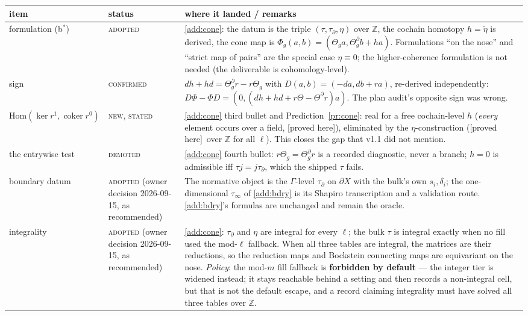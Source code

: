 \documentclass[11pt]{article}
\theoremstyle{remark}
\newcommand{\Z}{\mathbb{Z}}
\newcommand{\Hom}{\mathrm{Hom}}
\newcommand{\Ga}{\Gamma}
\DeclareMathOperator{\coker}{coker}
\newcommand{\PROVED}{\textsf{[proved here]}}
\begin{document}
\begin{center}\footnotesize
\begin{longtable}{@{}>{\raggedright\arraybackslash}p{2.4cm}>{\raggedright\arraybackslash}p{2.3cm}>{\raggedright\arraybackslash}p{10.8cm}@{}}
\toprule
item & status & where it landed / remarks \\
\midrule
\endhead
formulation (b$^\ast$) & \textsc{adopted} & \ref{add:cone}: the datum is the triple $(\tau,\tau_\partial,\eta)$ over $\Z$, the cochain homotopy $h=\tilde\eta$ is derived, the cone map is $\Phi_g(a,b)=(\Theta_ga,\Theta^\partial_gb+ha)$. Formulations ``on the nose'' and ``strict map of pairs'' are the special case $\eta\equiv0$; the higher-coherence formulation is not needed (the deliverable is cohomology-level). \\
sign & \textsc{confirmed} & $dh+hd=\Theta^\partial_gr-r\Theta_g$ with $D(a,b)=(-da,db+ra)$, re-derived independently: $D\Phi-\Phi D=(0,(dh+hd+r\Theta-\Theta^\partial r)a)$. The plan audit's opposite sign was wrong. \\
$\Hom(\ker r^1,\coker r^0)$ & \textsc{new, stated} & \ref{add:cone} third bullet and Prediction~\ref{pr:cone}: real for a free cochain-level $h$ (\emph{every} element occurs over a field, \PROVED), eliminated by the $\eta$-construction (\PROVED\ over $\Z$ for all $\ell$). This closes the gap that v1.1 did not mention. \\
the entrywise test & \textsc{demoted} & \ref{add:cone} fourth bullet: $r\Theta_g=\Theta^\partial_gr$ is a recorded diagnostic, never a branch; $h=0$ is admissible iff $\tau j=j\tau_\partial$, which the shipped $\tau$ fails. \\
boundary datum & \textsc{adopted} (owner decision 2026-09-15, as recommended) & The normative object is the $\Ga$-level $\tau_\partial$ on $\partial X$ with the bulk's own $s_i,\delta_i$; the one-dimensional $\tau_\infty$ of \ref{add:bdry} is its Shapiro transcription and a validation route. \ref{add:bdry}'s formulas are unchanged and remain the oracle. \\
integrality & \textsc{adopted} (owner decision 2026-09-15, as recommended) & \ref{add:cone}: $\tau_\partial$ and $\eta$ are integral for every $\ell$; the bulk $\tau$ is integral exactly when no fill used the mod-$\ell$ fallback. When all three tables are integral, the matrices are their reductions, so the reduction maps and Bockstein connecting maps are equivariant on the nose. \emph{Policy}: the mod-$m$ fill fallback is \textbf{forbidden by default} --- the integer tier is widened instead; it stays reachable behind a setting and then records a non-integral cell, but that is not the default escape, and a record claiming integrality must have solved all three tables over $\Z$. \\

\end{longtable}
\end{center}
\end{document}
